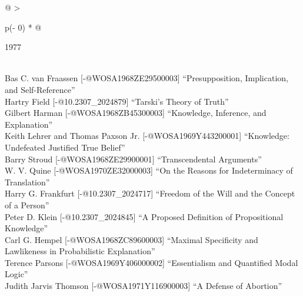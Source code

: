\documentclass[
  10pt,
  letterpaper,
  DIV=11,
  numbers=noendperiod,
  twoside]{scrartcl}
\begin{document}
\begin{longtable}[]{@{}
  >{\raggedright\arraybackslash}p{(\columnwidth - 0\tabcolsep) * }@{}}

\caption{\label{tbl-top-ten-1968}Most cited articles published less than
ten years ago as of 1977.}

\tabularnewline

\toprule\noalign{}
\begin{minipage}[b]{\linewidth}\raggedright
1977
\end{minipage} \\
\midrule\noalign{}
\endhead
\bottomrule\noalign{}
\endlastfoot
Bas C. van Fraassen {[}-@WOSA1968ZE29500003{]} ``Presupposition,
Implication, and Self-Reference'' \\
Hartry Field {[}-@10.2307\_2024879{]} ``Tarski's Theory of Truth'' \\
Gilbert Harman {[}-@WOSA1968ZB45300003{]} ``Knowledge, Inference, and
Explanation'' \\
Keith Lehrer and Thomas Paxson Jr. {[}-@WOSA1969Y443200001{]}
``Knowledge: Undefeated Justified True Belief'' \\
Barry Stroud {[}-@WOSA1968ZE29900001{]} ``Transcendental Arguments'' \\
W. V. Quine {[}-@WOSA1970ZE32000003{]} ``On the Reasons for
Indeterminacy of Translation'' \\
Harry G. Frankfurt {[}-@10.2307\_2024717{]} ``Freedom of the Will and
the Concept of a Person'' \\
Peter D. Klein {[}-@10.2307\_2024845{]} ``A Proposed Definition of
Propositional Knowledge'' \\
Carl G. Hempel {[}-@WOSA1968ZC89600003{]} ``Maximal Specificity and
Lawlikeness in Probabilistic Explanation'' \\
Terence Parsons {[}-@WOSA1969Y406000002{]} ``Essentialism and Quantified
Modal Logic'' \\
Judith Jarvis Thomson {[}-@WOSA1971Y116900003{]} ``A Defense of
Abortion'' \\

\end{longtable}
\end{document}
